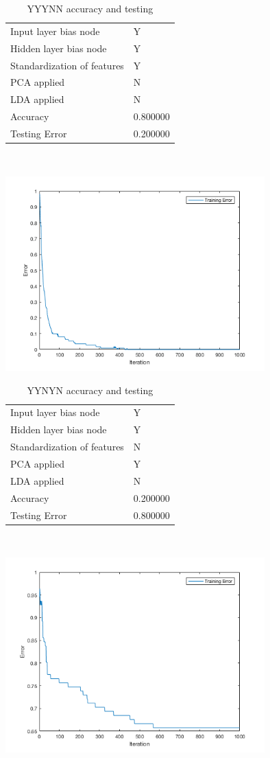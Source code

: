 \documentclass[12pt]{article}
\newcommand{\accuracyAndTestErrorTable}[8]{
  \begin{tabular}{l|l}
    \hline
    Input layer bias node & #1 \\
    Hidden layer bias node & #2 \\
    Standardization of features & #3 \\
    PCA applied & #4 \\
    LDA applied & #5 \\
    \hline
    Accuracy & #6 \\
    Testing Error & #7 \\
    \hline
  \end{tabular}
  ~\\[60pt]
  \caption{#8}
}
\begin{document}


\begin{center}
  \begin{table}[H]
    \begin{varwidth}[b]{0.4\linewidth}
      \centering
      \accuracyAndTestErrorTable{Y}{Y}{Y}{N}{N}{0.800000}{0.200000}{YYYNN accuracy and testing}
      \label{table:YYYNN}
    \end{varwidth}%
    \hfill
    \begin{minipage}[b]{0.6\linewidth}
      \centering
      \includegraphics[width=100mm]{YYYNN_training_error.png}
      \label{fig:YYYNN}
    \end{minipage}
  \end{table}
\end{center}

\begin{center}
  \begin{table}[H]
    \begin{varwidth}[b]{0.4\linewidth}
      \centering
      \accuracyAndTestErrorTable{Y}{Y}{N}{Y}{N}{0.200000}{0.800000}{YYNYN accuracy and testing}
      \label{table:YYNYN}
    \end{varwidth}%
    \hfill
    \begin{minipage}[b]{0.6\linewidth}
      \centering
      \includegraphics[width=100mm]{YYNYN_training_error.png}
      \label{fig:YYNYN}
    \end{minipage}
  \end{table}
\end{center}
\end{document}
